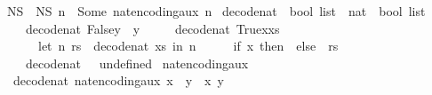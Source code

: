 \begin{isabellebody}
\isanewline
{}\isamarkupfalse%
\ N\isactrlsub S\ \ {\isachardoublequoteopen}N\isactrlsub S\ n\ {\isacharequal}{\kern0pt}\ Some\ {\isacharparenleft}{\kern0pt}nat{\isacharunderscore}{\kern0pt}encoding{\isacharunderscore}{\kern0pt}aux\ n{\isacharparenright}{\kern0pt}{\isachardoublequoteclose}\isanewline
\isanewline
{}\isamarkupfalse%
\ decode{\isacharunderscore}{\kern0pt}nat\ {\isacharcolon}{\kern0pt}{\isacharcolon}{\kern0pt}\ {\isachardoublequoteopen}bool\ list\ {\isasymRightarrow}\ nat\ {\isasymtimes}\ bool\ list{\isachardoublequoteclose}\ \isanewline
\ \ \isanewline
\ \ \ \ {\isachardoublequoteopen}decode{\isacharunderscore}{\kern0pt}nat\ {\isacharparenleft}{\kern0pt}False{\isacharhash}{\kern0pt}y{\isacharparenright}{\kern0pt}\ {\isacharequal}{\kern0pt}\ {\isacharparenleft}{\kern0pt}{}{\isacharcomma}{\kern0pt}y{\isacharparenright}{\kern0pt}{\isachardoublequoteclose}\ {\isacharbar}{\kern0pt}\isanewline
\ \ \ \ {\isachardoublequoteopen}decode{\isacharunderscore}{\kern0pt}nat\ {\isacharparenleft}{\kern0pt}True{\isacharhash}{\kern0pt}x{\isacharhash}{\kern0pt}xs{\isacharparenright}{\kern0pt}\ {\isacharequal}{\kern0pt}\ \isanewline
\ \ \ \ \ \ {\isacharparenleft}{\kern0pt}let\ {\isacharparenleft}{\kern0pt}n{\isacharcomma}{\kern0pt}\ rs{\isacharparenright}{\kern0pt}\ {\isacharequal}{\kern0pt}\ decode{\isacharunderscore}{\kern0pt}nat\ xs\ in\ {\isacharparenleft}{\kern0pt}n\ {\isacharasterisk}{\kern0pt}\ {}\ {\isacharplus}{\kern0pt}\ {}\ {\isacharplus}{\kern0pt}\ {\isacharparenleft}{\kern0pt}if\ x\ then\ {}\ else\ {}{\isacharparenright}{\kern0pt}{\isacharcomma}{\kern0pt}\ rs{\isacharparenright}{\kern0pt}{\isacharparenright}{\kern0pt}{\isachardoublequoteclose}\ {\isacharbar}{\kern0pt}\isanewline
\ \ \ \ {\isachardoublequoteopen}decode{\isacharunderscore}{\kern0pt}nat\ {\isacharunderscore}{\kern0pt}\ {\isacharequal}{\kern0pt}\ undefined{\isachardoublequoteclose}\isanewline
\isanewline
{}\isamarkupfalse%
\ nat{\isacharunderscore}{\kern0pt}encoding{\isacharunderscore}{\kern0pt}aux{\isacharcolon}{\kern0pt}\isanewline
\ \ {\isachardoublequoteopen}decode{\isacharunderscore}{\kern0pt}nat\ {\isacharparenleft}{\kern0pt}nat{\isacharunderscore}{\kern0pt}encoding{\isacharunderscore}{\kern0pt}aux\ x\ {\isacharat}{\kern0pt}\ y{\isacharparenright}{\kern0pt}\ {\isacharequal}{\kern0pt}\ {\isacharparenleft}{\kern0pt}x{\isacharcomma}{\kern0pt}\ y{\isacharparenright}{\kern0pt}{\isachardoublequoteclose}\isanewline
%
\isadelimproof
\ \ %
\endisadelimproof

\end{isabellebody}

